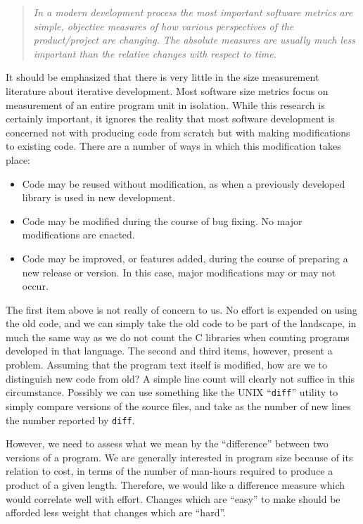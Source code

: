 \begin{quotation}
  \em
  In a modern development process the most important software metrics are
  simple, objective measures of how various perspectives of the
  product/project are changing.  The absolute measures are usually much less
  important than the relative changes with respect to time.
\end{quotation}

It should be emphasized that there is very little in the size
measurement literature about iterative development.  Most software
size metrics focus on measurement of an entire program unit in
isolation.  While this research is certainly important, it ignores the
reality that most software development is concerned not with producing
code from scratch but with making modifications to existing code.
There are a number of ways in which this modification takes place:

\begin{itemize}

\item Code may be reused without modification, as when a previously
developed library is used in new development.

\item Code may be modified during the course of bug fixing.  No major
modifications are enacted.

\item Code may be improved, or features added, during the course of
preparing a new release or version.  In this case, major modifications 
may or may not occur.

\end{itemize}

The first item above is not really of concern to us.  No effort is
expended on using the old code, and we can simply take the old code to 
be part of the landscape, in much the same way as we do not count the
C libraries when counting programs developed in that language.  The
second and third items, however, present a problem.  Assuming that the 
program text itself is modified, how are we to distinguish new code
from old?  A simple line count will clearly not suffice in this
circumstance.  Possibly we can use something like the UNIX ``{\tt diff}''\cite{diff}
utility to simply compare versions of the source files, and take as
the number of new lines the number reported by {\tt diff}.

However, we need to assess what we mean by the ``difference'' between two
versions of a program.  We are generally interested in program size
because of its relation to cost, in terms of the number of man-hours
required to produce a product of a given length.  Therefore, we would
like a difference measure which would correlate well with effort.
Changes which are ``easy'' to make should be afforded less weight that 
changes which are ``hard''.  

